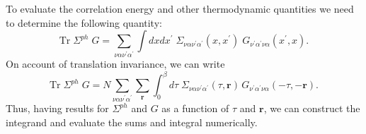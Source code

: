 To evaluate
the correlation energy and other thermodynamic
quantities we need to determine the following quantity:
\begin{equation}
\mathrm{Tr}\;\Sigma^{ph} \; G =
   \sum_{\nu\alpha\nu^{\prime}\alpha^{\prime}} \int dx dx^{\prime}\;
  \Sigma_{\nu\alpha\nu^{\prime}\alpha^{\prime}}(x,x^{\prime})\;
G_{\nu^{\prime}\alpha^{\prime}\nu\alpha}(x^{\prime},x).
\end{equation}
On account of translation invariance, we can write
\begin{equation}
\mathrm{Tr}\;\Sigma^{ph} \; G = N \sum_{\nu\alpha\nu^{\prime}\alpha^{\prime}} 
\sum_{\mathbf{r}} \int_0^{\beta} d\tau \;
\Sigma_{\nu\alpha\nu^{\prime}\alpha^{\prime}}(\tau,\mathbf{r})\,
G_{\nu^{\prime}\alpha^{\prime}\nu\alpha}(-\tau,-\mathbf{r}).
\end{equation}
Thus, having results for $\Sigma^{ph}$ and $G$ as
a function of $\tau$ and $\mathbf{r}$, we can construct
the integrand and evaluate the sums and integral numerically.

